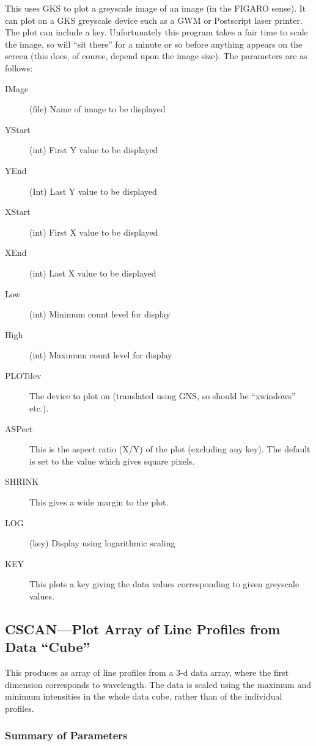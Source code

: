 This uses GKS to plot a greyscale image of an image (in the FIGARO
sense). It can plot on a GKS greyscale device such as a GWM or
Postscript laser printer.
The plot can include a key. Unfortunately this
program takes a fair time to scale the image, so will ``sit there''
for a minute or so before anything appears on the screen (this does, of
course, depend upon the image size). The parameters are as follows:
\begin{description}
\item[IMage] (file) Name of image to be displayed 
\item[YStart] (int) First Y value to be displayed 
\item[YEnd] (Int) Last Y value to be displayed 
\item[XStart] (int) First X value to be displayed 
\item[XEnd] (int) Last X value to be displayed 
\item[Low] (int) Minimum count level for display 
\item[High] (int) Maximum count level for display 
\item[PLOTdev] The device to plot on (translated using GNS, so
should be ``xwindows'' etc.).
\item[ASPect] This is the aspect ratio (X/Y) of the plot (excluding
any key). The default is set to the value which gives square pixels.
\item[SHRINK] This gives a wide margin to the plot.
\item[LOG] (key) Display using logarithmic scaling 
\item[KEY] This plots a key giving the data values corresponding to
given greyscale values.
\end{description}

\subsection{CSCAN---Plot Array of Line Profiles from Data ``Cube''}

This produces as array of line profiles from a 3-d data array, where
the first dimension corresponds to wavelength. The data is scaled using
the maximum and minimum intensities in the whole data cube, rather than
of the individual profiles.

\subsubsection{Summary of Parameters}

